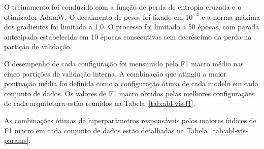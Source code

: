 O treinamento foi conduzido com a função de perda de entropia cruzada e o otimizador AdamW. O decaimento de pesos foi fixado em $10^{-4}$ e a norma máxima dos gradientes foi limitada a 1,0. O processo foi limitado a 50 épocas, com parada antecipada estabelecida em 10 épocas consecutivas sem decréscimo da perda na partição de validação.

O desempenho de cada configuração foi mensurado pelo F1 macro médio nas cinco partições de validação interna. A combinação que atingiu a maior pontuação média foi definida como a configuração ótima de cada modelo em cada conjunto de dados. Os valores de F1 macro obtidos pelas melhores configurações de cada arquitetura estão reunidos na Tabela~\ref{tab:abl-vis-f1}.

\begin{table}[htb]
\centering
\caption{F1 macro (média $\pm$ desvio padrão entre as 5 partições de validação) da via visual isolada, na melhor combinação de hiperparâmetros de cada modelo. Em negrito, o maior valor médio de cada conjunto de dados.}
\label{tab:abl-vis-f1}
\small
{}
\end{table}

As combinações ótimas de hiperparâmetros responsáveis pelos maiores índices de F1 macro em cada conjunto de dados estão detalhadas na Tabela~\ref{tab:abl-vis-params}.

